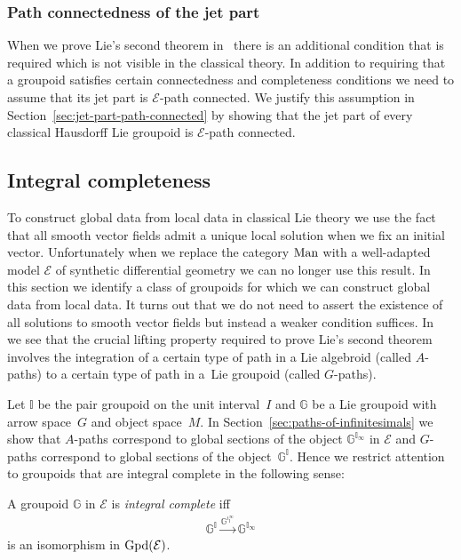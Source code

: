 \documentclass[10pt,a4paper]{amsart}
\numberwithin{equation}{section}
\begin{document}
\subsubsection{Path connectedness of the jet part}

When we prove Lie's second theorem in~\cite{burke-relative-to-local-models} there is an additional condition that is required which is not visible in the classical theory. In addition to requiring that a groupoid satisf\/ies certain connectedness and completeness conditions we need to assume that its jet part is $\mathcal{E}$-path connected. We justify this assumption in Section~\ref{sec:jet-part-path-connected} by showing that the jet part of every classical Hausdorf\/f Lie groupoid is $\mathcal{E}$-path connected.

\subsection{Integral completeness}

To construct global data from local data in classical Lie theory we use the fact that all smooth vector f\/ields admit a unique local solution when we f\/ix an initial vector. Unfortunately when we replace the category ${\rm Man}$ with a well-adapted model $\mathcal{E}$ of synthetic dif\/ferential geometry we can no longer use this result. In this section we identify a class of groupoids for which we can construct global data from local data. It turns out that we do not need to assert the existence of all solutions to smooth vector f\/ields but instead a weaker condition suf\/f\/ices. In~\cite{MR1973056} we see that the crucial lifting property required to prove Lie's second theorem involves the integration of a certain type of path in a Lie algebroid (called $A$-paths) to a certain type of path in a~Lie groupoid (called $G$-paths).

Let $\mathbb{I}$ be the pair groupoid on the unit interval~$I$ and $\mathbb{G}$ be a Lie groupoid with arrow space~$G$ and object space~$M$. In Section~\ref{sec:paths-of-infinitesimals} we show that $A$-paths correspond to global sections of the object $\mathbb{G}^{\mathbb{I}_{\infty}}$ in $\mathcal{E}$ and $G$-paths correspond to global sections of the object~$\mathbb{G}^{\mathbb{I}}$. Hence we restrict attention to groupoids that are integral complete in the following sense:
\begin{Definition}\label{def:integral-complete}
 A groupoid $\mathbb{G}$ in $\mathcal{E}$ is \emph{integral complete} if\/f
 \begin{gather*}\mathbb{G}^{\mathbb{I}} \xrightarrow{\mathbb{G}^{\iota_{\mathbb{I}}^{\infty}}} \mathbb{G}^{\mathbb{I}_{\infty}}\end{gather*}
 is an isomorphism in ${\rm Gpd}(\mathcal{E})$.
\end{Definition}
\end{document}
